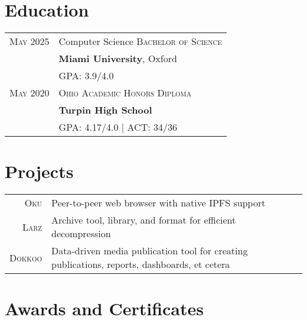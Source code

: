 \documentclass[a4paper,10pt]{article} %
\begin{document}

\section{Education}

\begin{tabular}{rl}	
\textsc{May 2025} & Computer Science \textsc{Bachelor of Science}\\ &
\textbf{Miami University}, Oxford\\
&\normalsize \textsc{GPA}: 3.9/4.0 \\


\textsc{May 2020} & \textsc{Ohio Academic Honors Diploma}\\ &
\textbf{Turpin High School}\\
&\normalsize \textsc{GPA}: 4.17/4.0 {\hfill| \footnotesize \textsc{ACT}: 34/36}\\
\end{tabular}


\section{Projects}

\begin{tabular}{rl}
\textsc{Oku} & Peer-to-peer web browser with native IPFS support\\
\textsc{Larz} & Archive tool, library, and format for efficient decompression\\
\textsc{Dokkoo} & Data-driven media publication tool for creating publications, reports, dashboards, et cetera\\
\end{tabular}


\section{Awards and Certificates}
\end{document}
